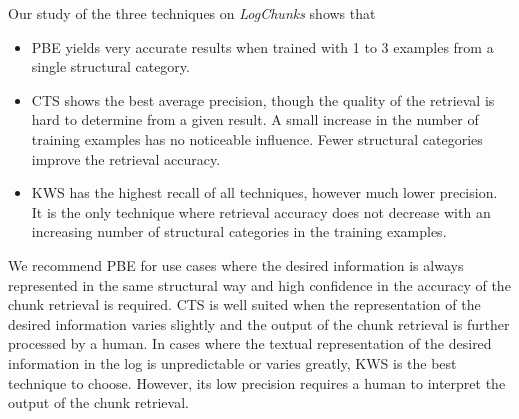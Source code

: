 \documentclass[\myrootdir/main.tex]{subfiles}
\begin{document}
Our study of the three techniques on \emph{LogChunks} shows that
\begin{itemize}
  \item PBE yields very accurate results when trained with 1 to 3 examples from a single structural category.
  \item CTS shows the best average precision, though the quality of the retrieval is hard to determine from a given result.
  A small increase in the number of training examples has no noticeable influence.
  Fewer structural categories improve the retrieval accuracy.
  \item KWS has the highest recall of all techniques, however much lower precision.
  It is the only technique where retrieval accuracy does not decrease with an increasing number of structural categories in the training examples.
\end{itemize}
We recommend PBE for use cases where the desired information is always represented in the same structural way and high confidence in the accuracy of the chunk retrieval is required.
CTS is well suited when the representation of the desired information varies slightly and the output of the chunk retrieval is further processed by a human.
In cases where the textual representation of the desired information in the log is unpredictable or varies greatly, KWS is the best technique to choose.
However, its low precision requires a human to interpret the output of the chunk retrieval.
\end{document}
